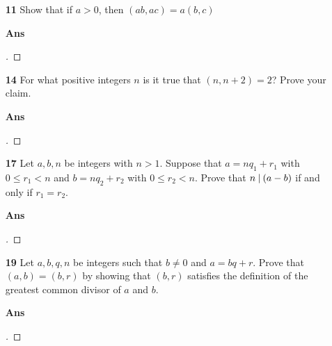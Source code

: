 \documentclass[paper=usletter, fontsize=12pt]{article}
\begin{document}
\begin{itemize}
\begin{itemize}
\begin{itemize}
                \end{itemize}

                \item[\textbf{11}] Show that if $a > 0$, then $(ab, ac) = a(b,
                c)$
                \item[\textbf{Ans}]
                \begin{proof}[\unskip\nopunct]
                \end{proof}
                \vspace{0.2in}

                \item[\textbf{14}] For what positive integers $n$ is it true
                that $(n , n + 2) = 2$? Prove your claim.
                \item[\textbf{Ans}]
                \begin{proof}[\unskip\nopunct]
                \end{proof}
                \vspace{0.2in}

                \item[\textbf{17}] Let $a, b, n$ be integers with $n > 1$.
                Suppose that $a = nq_1 + r_1$ with $0 \le r_1 < n$ and $b =
                nq_2 + r_2$ with $0 \le r_2 < n$. Prove that $n \:\vert\: (a - b)$
                if and only if $r_1 = r_2$.
                \item[\textbf{Ans}]
                \begin{proof}[\unskip\nopunct]
                \end{proof}
                \vspace{0.2in}

                \item[\textbf{19}] Let $a, b, q, n$ be integers such that $b
                \ne 0$ and $a = bq + r$. Prove that $(a, b) = (b, r)$ by
                showing that $(b, r)$ satisfies the definition of the greatest
                common divisor of $a$ and $b$.
                \item[\textbf{Ans}]
                \begin{proof}[\unskip\nopunct]
                \end{proof}
                \vspace{0.2in}

            \end{itemize}



\end{itemize}
\end{document}
